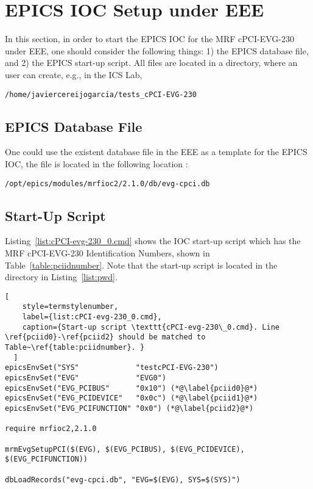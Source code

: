 \documentclass[11pt
  , a4paper
  , article
  , oneside
  , showtrims
]{memoir}
\begin{document}
\clearpage
\section{EPICS IOC Setup under EEE}
In this section, in order to start the EPICS IOC for the MRF cPCI-EVG-230 under EEE, one should consider the following things: 1) the EPICS database file, and 2) the EPICS start-up script. All files are located in a directory, where an user can create, e.g., in the ICS Lab, 
\begin{lstlisting}[style=termstyle, label={list:pwd}, caption={Working Directory in the ICS lab.} ]
  /home/javiercereijogarcia/tests_cPCI-EVG-230
\end{lstlisting}

\subsection{EPICS Database File}
One could use the existent database file in the EEE as a template for the EPICS IOC, the file is located in the following location : 
\begin{lstlisting}[style=termstyle]
/opt/epics/modules/mrfioc2/2.1.0/db/evg-cpci.db
\end{lstlisting}


\subsection{Start-Up Script}
Listing~\ref{list:cPCI-evg-230_0.cmd} shows the IOC start-up script which has the MRF cPCI-EVG-230 Identification Numbers, shown in Table~\ref{table:pciidnumber}. Note that the start-up script is located in the directory in Listing~\ref{list:pwd}.


\begin{lstlisting}[
    style=termstylenumber,
    label={list:cPCI-evg-230_0.cmd},
    caption={Start-up script \texttt{cPCI-evg-230\_0.cmd}. Line \ref{pciid0}-\ref{pciid2} should be matched to Table~\ref{table:pciidnumber}. }
  ]
epicsEnvSet("SYS"             "testcPCI-EVG-230")
epicsEnvSet("EVG"             "EVG0")
epicsEnvSet("EVG_PCIBUS"      "0x10") (*@\label{pciid0}@*)
epicsEnvSet("EVG_PCIDEVICE"   "0x0c") (*@\label{pciid1}@*)
epicsEnvSet("EVG_PCIFUNCTION" "0x0") (*@\label{pciid2}@*)

require mrfioc2,2.1.0

mrmEvgSetupPCI($(EVG), $(EVG_PCIBUS), $(EVG_PCIDEVICE), $(EVG_PCIFUNCTION))

dbLoadRecords("evg-cpci.db", "EVG=$(EVG), SYS=$(SYS)")
  
\end{lstlisting}
\end{document}
